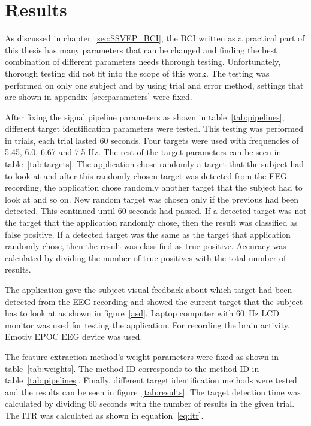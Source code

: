 
\chapter{Results}

As discussed in chapter~\ref{sec:SSVEP_BCI}, the \gls{BCI} written as a practical part of this thesis has many parameters that can be changed and finding the best combination of different parameters needs thorough testing. Unfortunately, thorough testing did not fit into the scope of this work. The testing was performed on only one subject and by using trial and error method, settings that are shown in appendix~\ref{sec:parameters} were fixed.

After fixing the signal pipeline parameters as shown in table~\ref{tab:pipelines}, different target identification parameters were tested. This testing was performed in trials, each trial lasted 60 seconds. Four targets were used with frequencies of 5.45, 6.0, 6.67 and 7.5 Hz. The rest of the target parameters can be seen in table~\ref{tab:targets}. The application chose randomly a target that the subject had to look at and after this randomly chosen target was detected from the \gls{EEG} recording, the application chose randomly another \gls{target} that the subject had to look at and so on. New random \gls{target} was chosen only if the previous had been detected. This continued until 60 seconds had passed. If a detected \gls{target} was not the \gls{target} that the application randomly chose, then the result was classified as false positive. If a detected \gls{target} was the same as the \gls{target} that application randomly chose, then the result was classified as true positive. Accuracy was calculated by dividing the number of true positives with the total number of results.

The application gave the subject visual feedback about which \gls{target} had been detected from the \gls{EEG} recording and showed the current \gls{target} that the subject has to look at as shown in figure~\ref{asd}. Laptop computer with \SI{60}{Hz} LCD monitor was used for testing the application. For recording the brain activity, Emotiv EPOC \gls{EEG} device was used.

The \gls{feature extraction} method's weight parameters were fixed as shown in table~\ref{tab:weights}. The method ID corresponds to the method ID in table~\ref{tab:pipelines}. Finally, different \gls{target} identification methods were tested and the results can be seen in figure~\ref{tab:results}. The \gls{target} detection time was calculated by dividing 60 seconds with the number of results in the given trial. The \gls{ITR} was calculated as shown in equation~\ref{eq:itr}.

